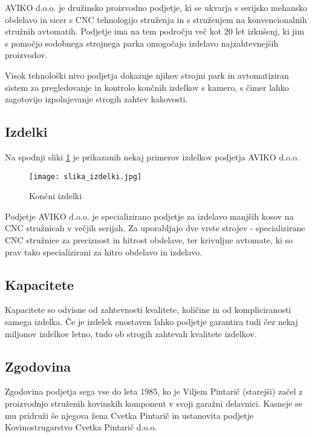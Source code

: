 AVIKO d.o.o. je družinsko proizvodno podjetje,
ki se ukvarja s serijsko mehansko obdelavo in sicer 
s CNC tehnologijo struženja in s struženjem na 
konvencionalnih stružnih avtomatih. 
Podjetje ima na tem področju več kot 20 let izkušenj, 
ki jim s pomočjo sodobnega strojnega parka omogočajo 
izdelavo najzahtevnejših proizvodov.

Visok tehnološki nivo podjetja dokazuje njihov strojni 
park in avtomatiziran sistem za pregledovanje in 
kontrolo končnih izdelkov s kamero, s čimer lahko 
zagotovijo izpolnjevanje strogih zahtev kakovosti.

\subsection{Izdelki}

    Na spodnji sliki \ref{koncni_izdelki} je prikazanih nekaj primerov izdelkov podjetja AVIKO d.o.o.
    \begin{figure}[h]
        \begin{center}
            \texttt{[image: slika\_izdelki.jpg]}
            \caption{Končni izdelki
                    \cite{interna}}
            \label{koncni_izdelki}
        \end{center}
        
    \end{figure}
    
    Podjetje AVIKO d.o.o. je specializirano podjetje za izdelavo 
    manjših kosov na CNC stružnicah v večjih serijah. Za uporabljajo dve
    vrste strojev - specializirane CNC stružnice za preciznost in hitrost obdelave,
    ter krivuljne avtomate, ki so prav tako specializirani za hitro obdelavo in izdelavo.

\subsection{Kapacitete}
    Kapacitete so odvisne od zahtevnosti kvalitete, količine 
    in od kompliciranosti samega izdelka. Če je izdelek enostaven
    lahko podjetje garantira tudi čez nekaj miljonov izdelkov letno,
    tudo ob strogih zahtevah kvalitete izdelkov.

\subsection{Zgodovina}
    Zgodovina podjetja sega vse do leta 1985, ko je Viljem Pintarič (starejši)
    začel z proizvodnjo struženih kovinskih komponent v svoji garažni delavnici.
    Kasneje se mu pridruži še njegova žena Cvetka Pintarič in ustanovita
    podjetje Kovinostrugarstvo Cvetka Pintarič d.o.o.

